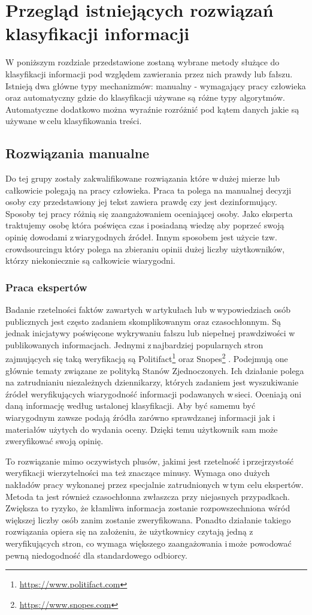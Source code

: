 \newpage %
\section{Przegląd istniejących rozwiązań klasyfikacji informacji}
W poniższym rozdziale przedstawione zostaną wybrane metody służące do klasyfikacji informacji pod względem zawierania przez nich prawdy lub fałszu. Istnieją dwa główne typy mechanizmów: manualny - wymagający pracy człowieka oraz automatyczny gdzie do klasyfikacji używane są różne typy algorytmów. Automatyczne dodatkowo można wyraźnie rozróżnić pod kątem danych jakie są używane w\,celu klasyfikowania treści. 
\subsection{Rozwiązania manualne}
Do tej grupy zostały zakwalifikowane rozwiązania które w\,dużej mierze lub całkowicie polegają na pracy człowieka. Praca ta polega na manualnej decyzji osoby czy przedstawiony jej tekst zawiera prawdę czy jest dezinformujący. Sposoby tej pracy różnią się zaangażowaniem oceniającej osoby. Jako eksperta traktujemy osobę która poświęca czas i\,posiadaną wiedzę aby poprzeć swoją opinię dowodami z\,wiarygodnych źródeł. Innym sposobem jest użycie tzw. crowdsourcingu który polega na zbieraniu opinii dużej liczby użytkowników, którzy niekoniecznie są całkowicie wiarygodni. 
\subsubsection{Praca ekspertów}
Badanie rzetelności faktów zawartych w\,artykułach lub w\,wypowiedziach osób publicznych jest często zadaniem skomplikowanym oraz czasochłonnym. Są jednak inicjatywy poświęcone wykrywaniu fałszu lub niepełnej prawdziwości w\,publikowanych informacjach. Jednymi z\,najbardziej popularnych stron zajmujących się taką weryfikacją są Politifact\footnote{\url{https://www.politifact.com}} oraz Snopes\footnote{\url{https://www.snopes.com}} . Podejmują one głównie tematy związane ze polityką Stanów Zjednoczonych. Ich działanie polega na zatrudnianiu niezależnych dziennikarzy, których zadaniem jest wyszukiwanie źródeł weryfikujących wiarygodność informacji podawanych w\,sieci. Oceniają oni daną informację według ustalonej klasyfikacji. Aby być samemu być wiarygodnym zawsze podają źródła zarówno sprawdzanej informacji jak i\,materiałów użytych do wydania oceny. Dzięki temu użytkownik sam może zweryfikować swoją opinię. 
\par To rozwiązanie mimo oczywistych plusów, jakimi jest rzetelność i\,przejrzystość weryfikacji wierzytelności ma też znaczące minusy. Wymaga ono dużych nakładów pracy wykonanej przez specjalnie zatrudnionych w\,tym celu ekspertów. Metoda ta jest również czasochłonna zwłaszcza przy niejasnych przypadkach. Zwiększa to ryzyko, że kłamliwa informacja zostanie rozpowszechniona wśród większej liczby osób zanim zostanie zweryfikowana. Ponadto działanie takiego rozwiązania opiera się na założeniu, że użytkownicy czytają jedną z\,weryfikujących stron, co wymaga większego zaangażowania i\,może powodować pewną niedogodność dla standardowego odbiorcy. 
